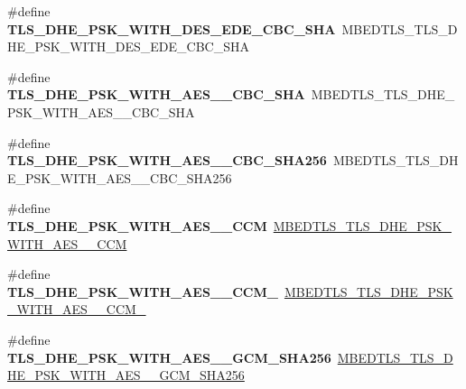 \begin{DoxyCompactItemize}
\item 
\mbox{\label{compat-1_83_8h_aac94b0631a635b24b6a8cddb4ba87fa9}} 
\#define {\bfseries T\+L\+S\+\_\+\+D\+H\+E\+\_\+\+P\+S\+K\+\_\+\+W\+I\+T\+H\+\_\+D\+E\+S\+\_\+\+E\+D\+E\+\_\+\+C\+B\+C\+\_\+\+S\+HA}~M\+B\+E\+D\+T\+L\+S\+\_\+\+T\+L\+S\+\_\+\+D\+H\+E\+\_\+\+P\+S\+K\+\_\+\+W\+I\+T\+H\+\_\+D\+E\+S\+\_\+\+E\+D\+E\+\_\+\+C\+B\+C\+\_\+\+S\+HA
\item 
\mbox{\label{compat-1_83_8h_a01627f31497f42e8d272161fa6973bf6}} 
\#define {\bfseries T\+L\+S\+\_\+\+D\+H\+E\+\_\+\+P\+S\+K\+\_\+\+W\+I\+T\+H\+\_\+\+A\+E\+S\+\_\+\_\+\+C\+B\+C\+\_\+\+S\+HA}~M\+B\+E\+D\+T\+L\+S\+\_\+\+T\+L\+S\+\_\+\+D\+H\+E\+\_\+\+P\+S\+K\+\_\+\+W\+I\+T\+H\+\_\+\+A\+E\+S\+\_\+\_\+\+C\+B\+C\+\_\+\+S\+HA
\item 
\mbox{\label{compat-1_83_8h_a200c5f9cdf24c011caaf60e67b35428c}} 
\#define {\bfseries T\+L\+S\+\_\+\+D\+H\+E\+\_\+\+P\+S\+K\+\_\+\+W\+I\+T\+H\+\_\+\+A\+E\+S\+\_\+\_\+\+C\+B\+C\+\_\+\+S\+H\+A256}~M\+B\+E\+D\+T\+L\+S\+\_\+\+T\+L\+S\+\_\+\+D\+H\+E\+\_\+\+P\+S\+K\+\_\+\+W\+I\+T\+H\+\_\+\+A\+E\+S\+\_\+\_\+\+C\+B\+C\+\_\+\+S\+H\+A256
\item 
\mbox{\label{compat-1_83_8h_a101bea173d3f5af2e2711f2f9c931d98}} 
\#define {\bfseries T\+L\+S\+\_\+\+D\+H\+E\+\_\+\+P\+S\+K\+\_\+\+W\+I\+T\+H\+\_\+\+A\+E\+S\+\_\+\_\+\+C\+CM}~\mbox{\hyperlink{ssl__ciphersuites_8h_a6da1d7d8f20ef360a23d5bd481359b90}{M\+B\+E\+D\+T\+L\+S\+\_\+\+T\+L\+S\+\_\+\+D\+H\+E\+\_\+\+P\+S\+K\+\_\+\+W\+I\+T\+H\+\_\+\+A\+E\+S\+\_\+\_\+\+C\+CM}}
\item 
\mbox{\label{compat-1_83_8h_a9af4047e8528535df0c2efe65aa9e56b}} 
\#define {\bfseries T\+L\+S\+\_\+\+D\+H\+E\+\_\+\+P\+S\+K\+\_\+\+W\+I\+T\+H\+\_\+\+A\+E\+S\+\_\+\_\+\+C\+C\+M\+\_}~\mbox{\hyperlink{ssl__ciphersuites_8h_a31040116f8e3b15310b67722de2a2511}{M\+B\+E\+D\+T\+L\+S\+\_\+\+T\+L\+S\+\_\+\+D\+H\+E\+\_\+\+P\+S\+K\+\_\+\+W\+I\+T\+H\+\_\+\+A\+E\+S\+\_\+\_\+\+C\+C\+M\+\_}}
\item 
\mbox{\label{compat-1_83_8h_ab95dab0a3d2433b066d2027fa16aa5ac}} 
\#define {\bfseries T\+L\+S\+\_\+\+D\+H\+E\+\_\+\+P\+S\+K\+\_\+\+W\+I\+T\+H\+\_\+\+A\+E\+S\+\_\+\_\+\+G\+C\+M\+\_\+\+S\+H\+A256}~\mbox{\hyperlink{ssl__ciphersuites_8h_ad9152bd1c1975fc6bebd8262977e7435}{M\+B\+E\+D\+T\+L\+S\+\_\+\+T\+L\+S\+\_\+\+D\+H\+E\+\_\+\+P\+S\+K\+\_\+\+W\+I\+T\+H\+\_\+\+A\+E\+S\+\_\+\_\+\+G\+C\+M\+\_\+\+S\+H\+A256}}

\end{DoxyCompactItemize}
